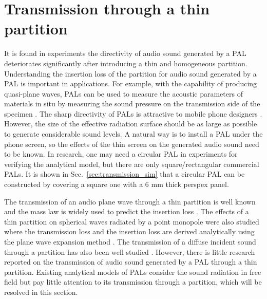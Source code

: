 \section{Transmission through a thin partition}
\label{sec:phys_transmission}

It is found in experiments the directivity of audio sound generated by a PAL deteriorates significantly after introducing a thin and homogeneous partition. 
Understanding the insertion loss of the partition for audio sound generated by a PAL is important in applications. 
For example, with the capability of producing quasi-plane waves, PALs can be used to measure the acoustic parameters of materials in situ by measuring the sound pressure on the transmission side of the specimen \cite{Castagnede2008LowFrequencySitu}. 
The sharp directivity of PALs is attractive to mobile phone designers \cite{Ahn2019CriticalStepUsing}. 
However, the size of the effective radiation surface should be as large as possible to generate considerable sound levels. 
A natural way is to install a PAL under the phone screen, so the effects of the thin screen on the generated audio sound need to be known. 
In research, one may need a circular PAL in experiments for verifying the analytical model, but there are only square/rectangular commercial PALs. 
It is shown in Sec.~\ref{sec:transmission_sim} that a circular PAL can be constructed by covering a square one with a 6 mm thick perspex panel.

The transmission of an audio plane wave through a thin partition is well known and the mass law is widely used to predict the insertion loss \cite{Pierce2019AcousticsIntroductionIts}. 
The effects of a thin partition on spherical waves radiated by a point monopole were also studied where the transmission loss and the insertion loss are derived analytically using the plane wave expansion method \cite{Shi2008SoundInsulationInfinite}. 
The transmission of a diffuse incident sound through a partition has also been well studied \cite{Pellicier2007ReviewAnalyticalMethods}. 
However, there is little research reported on the transmission of audio sound generated by a PAL through a thin partition. 
Existing analytical models of PALs consider the sound radiation in free field but pay little attention to its transmission through a partition, which will be resolved in this section.


